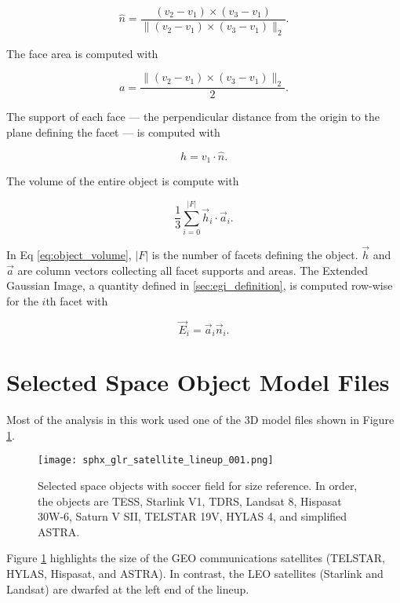 \begin{equation} \label{eq:facet_normal}
    \hat{n} = \frac{\left( v_2 - v_1 \right) \times \left( v_3 - v_1 \right)}{\| \left( v_2 - v_1 \right) \times \left( v_3 - v_1 \right) \|_2}.
\end{equation}

The face area is computed with

\begin{equation} \label{eq:facet_areas}
    a = \frac{\| \left( v_2 - v_1 \right) \times \left( v_3 - v_1 \right)\|_2}{2}.
\end{equation}

The support of each face --- the perpendicular distance from the origin to the plane defining the facet --- is computed with

\begin{equation} \label{eq:facet_support}
    h = v_1 \cdot \hat{n}.
\end{equation}

The volume of the entire object is compute with

\begin{equation} \label{eq:object_volume}
    \frac{1}{3} \sum_{i=0}^{ \lvert F \rvert}\vec{h}_i \cdot \vec{a}_i.
\end{equation}

In Eq \ref{eq:object_volume}, $\lvert F \rvert$ is the number of facets defining the object. $\vec{h}$ and $\vec{a}$ are column vectors collecting all facet supports and areas. The Extended Gaussian Image, a quantity defined in \ref{sec:egi_definition}, is computed row-wise for the $i$th facet with

\begin{equation} \label{eq:egi_definition}
    \vec{E}_i = \vec{a}_i \vec{n}_i.
\end{equation}

\section{Selected Space Object Model Files}

Most of the analysis in this work used one of the 3D model files shown in Figure \ref{fig:satellite_lineup}.

\begin{figure}[ht]
    \centering
    \texttt{[image: sphx\_glr\_satellite\_lineup\_001.png]}
    \caption{Selected space objects with soccer field for size reference. In order, the objects are TESS, Starlink V1, TDRS, Landsat 8, Hispasat 30W-6, Saturn V SII, TELSTAR 19V, HYLAS 4, and simplified ASTRA.
    }
    \label{fig:satellite_lineup}
\end{figure}

Figure \ref{fig:satellite_lineup} highlights the size of the GEO communications satellites (TELSTAR, HYLAS, Hispasat, and ASTRA). In contrast, the LEO satellites (Starlink and Landsat) are dwarfed at the left end of the lineup.